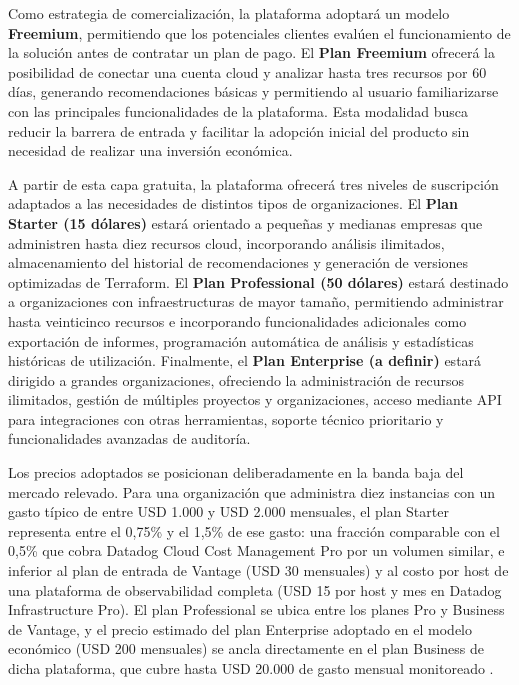 Como estrategia de comercialización, la plataforma adoptará un modelo \textbf{Freemium}, permitiendo que los potenciales clientes evalúen el funcionamiento de la solución antes de contratar un plan de pago. El \textbf{Plan Freemium} ofrecerá la posibilidad de conectar una cuenta cloud y analizar hasta tres recursos por 60 días, generando recomendaciones básicas y permitiendo al usuario familiarizarse con las principales funcionalidades de la plataforma. Esta modalidad busca reducir la barrera de entrada y facilitar la adopción inicial del producto sin necesidad de realizar una inversión económica.

A partir de esta capa gratuita, la plataforma ofrecerá tres niveles de suscripción adaptados a las necesidades de distintos tipos de organizaciones. El \textbf{Plan Starter (15 dólares)} estará orientado a pequeñas y medianas empresas que administren hasta diez recursos cloud, incorporando análisis ilimitados, almacenamiento del historial de recomendaciones y generación de versiones optimizadas de Terraform. El \textbf{Plan Professional (50 dólares)} estará destinado a organizaciones con infraestructuras de mayor tamaño, permitiendo administrar hasta veinticinco recursos e incorporando funcionalidades adicionales como exportación de informes, programación automática de análisis y estadísticas históricas de utilización. Finalmente, el \textbf{Plan Enterprise (a definir)} estará dirigido a grandes organizaciones, ofreciendo la administración de recursos ilimitados, gestión de múltiples proyectos y organizaciones, acceso mediante API para integraciones con otras herramientas, soporte técnico prioritario y funcionalidades avanzadas de auditoría.

Los precios adoptados se posicionan deliberadamente en la banda baja del mercado relevado. Para una organización que administra diez instancias con un gasto típico de entre USD 1.000 y USD 2.000 mensuales, el plan Starter representa entre el 0,75\% y el 1,5\% de ese gasto: una fracción comparable con el 0,5\% que cobra Datadog Cloud Cost Management Pro por un volumen similar, e inferior al plan de entrada de Vantage (USD 30 mensuales) y al costo por host de una plataforma de observabilidad completa (USD 15 por host y mes en Datadog Infrastructure Pro). El plan Professional se ubica entre los planes Pro y Business de Vantage, y el precio estimado del plan Enterprise adoptado en el modelo económico (USD 200 mensuales) se ancla directamente en el plan Business de dicha plataforma, que cubre hasta USD 20.000 de gasto mensual monitoreado \parencite{DatadogPricing2026, Vantage2026}.

